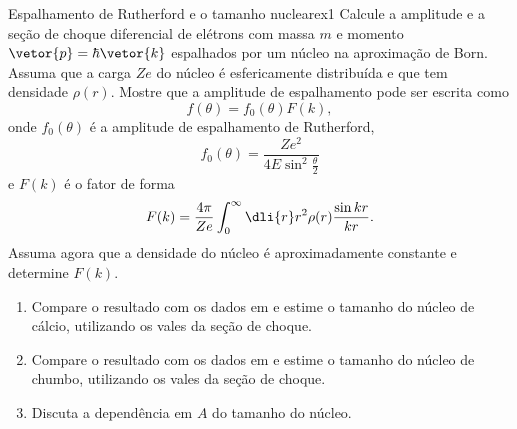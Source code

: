 \begin{exercício}{Espalhamento de Rutherford e o tamanho nuclear}{ex1}
   Calcule a amplitude e a seção de choque diferencial de elétrons com massa \(m\) e momento \(\vetor{p} = \hbar \vetor{k}\) espalhados por um núcleo na aproximação de Born. Assuma que a carga \(Ze\) do núcleo é esfericamente distribuída e que tem densidade \(\rho(r)\). Mostre que a amplitude de espalhamento pode ser escrita como
   \begin{equation*}
       f(\theta) = f_0(\theta) F(k),
   \end{equation*}
   onde \(f_0(\theta)\) é a amplitude de espalhamento de Rutherford,
   \begin{equation*}
      f_0(\theta) = \frac{Ze^2}{4E\sin^2\frac{\theta}{2}}
   \end{equation*}
   e \(F(k)\) é o fator de forma
   \begin{equation*}
      F(k) = \frac{4\pi}{Ze} \int_0^\infty \dli{r} r^2 \rho(r) \frac{\sin kr}{kr}.
   \end{equation*}
   Assuma agora que a densidade do núcleo é aproximadamente constante e determine \(F(k).\)
   \begin{enumerate}[label=(\alph*)]
      \item Compare o resultado com os dados em \cite{PhysRevLett.19.527} e estime o tamanho do núcleo de cálcio, utilizando os vales da seção de choque.
      \item Compare o resultado com os dados em \cite{PhysRevLett.19.242} e estime o tamanho do núcleo de chumbo, utilizando os vales da seção de choque.
      \item Discuta a dependência em \(A\) do tamanho do núcleo.
   \end{enumerate}
\end{exercício}
